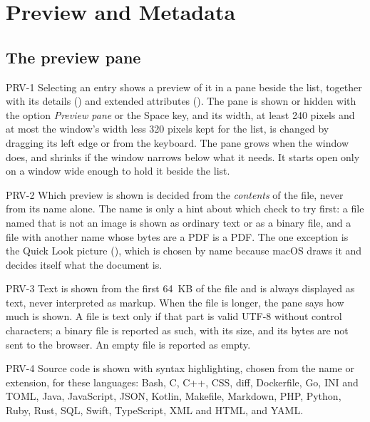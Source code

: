 \section{Preview and Metadata}
\label{sec:preview}

\subsection{The preview pane}

\begin{req}{PRV-1}
Selecting an entry shows a preview of it in a pane beside the list, together with
its details () and extended attributes ().  The pane is shown
or hidden with the option \emph{Preview pane} or the Space key, and its width, at
least 240 pixels and at most the window's width less 320 pixels kept for the list, is
changed by dragging its left edge or from the keyboard.  The pane grows when the window
does, and shrinks if the window narrows below what it needs.  It
starts open only on a window wide enough to hold it beside the list.
\end{req}

\begin{req}{PRV-2}
Which preview is shown is decided from the \emph{contents} of the file, never from its
name alone.  The name is only a hint about which check to try first: a file named
 that is not an image is shown as ordinary text or as a binary file, and a
file with another name whose bytes are a PDF is a PDF.  The one exception is the
Quick Look picture (), which is chosen by name because macOS draws it
and decides itself what the document is.
\end{req}

\begin{req}{PRV-3}
Text is shown from the first 64~KB of the file and is always displayed as text, never
interpreted as markup.  When the file is longer, the pane says how much is shown.  A
file is text only if that part is valid UTF-8 without control characters; a binary
file is reported as such, with its size, and its bytes are not sent to the browser.  An
empty file is reported as empty.
\end{req}

\begin{req}{PRV-4}
Source code is shown with syntax highlighting, chosen from the name or extension, for
these languages: Bash, C, C++, CSS, diff, Dockerfile, Go, INI and TOML, Java,
JavaScript, JSON, Kotlin, Makefile, Markdown, PHP, Python, Ruby, Rust, SQL, Swift,
TypeScript, XML and HTML, and YAML.
\end{req}

